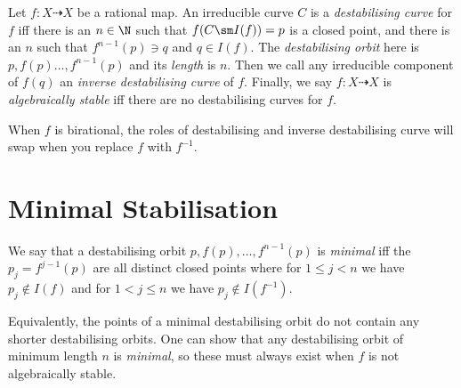 \documentclass[11pt, final]{amsart}
\newcommand{\nin}{\notin}
\begin{document}
\begin{defn}
Let $f : X \dashrightarrow X$ be a rational map. An irreducible curve $C$ is a \emph{destabilising curve} for $f$ iff there is an $n \in \N$ such that $f(C\sm I(f)) = p$ is a closed point, and there is an $n$ such that $f^{n-1}(p) \ni q$ and $q \in I(f)$. The \emph{destabilising orbit} here is $p, f(p)\dots, f^{n-1}(p)$ and its \emph{length} is $n$. Then we call any irreducible component of $f(q)$ an \emph{inverse destabilising curve} of $f$. 
%
Finally, we say $f : X \dashrightarrow X$ is \emph{algebraically stable} iff there are no destabilising curves for $f$.%
\end{defn}

 When $f$ is birational, the roles of destabilising and inverse destabilising curve will swap when you replace $f$ with $f^{-1}$. 
 
 
\section{Minimal Stabilisation}\label{sec:jud}

\begin{defn}
 We say that a destabilising orbit $p, f(p), \dots, f^{n-1}(p)$ is \emph{minimal} iff the $p_j = f^{j-1}(p)$ are all distinct closed points where for $1 \le j < n$ we have $p_j \nin I(f)$ and for $1 < j \le n$ we have $p_j \nin I(f^{-1})$.
\end{defn}

Equivalently, the points of a minimal destabilising orbit do not contain any shorter destabilising orbits. One can show that any destabilising orbit of minimum length $n$ is \emph{minimal}, so these must always exist when $f$ is not algebraically stable.
\end{document}
